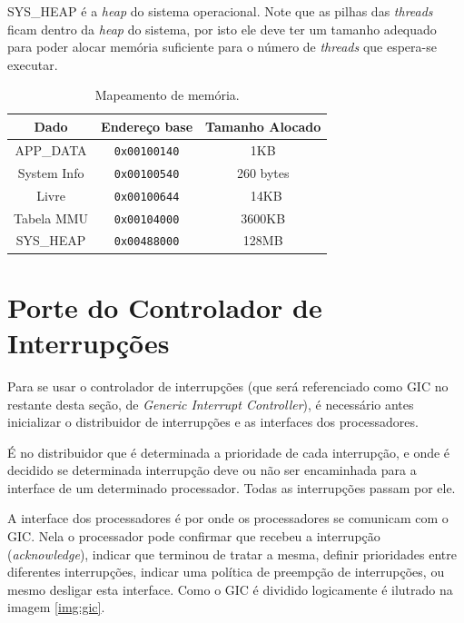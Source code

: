 SYS\_HEAP é a \emph{heap} do sistema operacional. Note que as pilhas das \emph{threads} ficam dentro da \emph{heap} do sistema, por isto ele deve ter um tamanho adequado para poder alocar memória suficiente para o número de \emph{threads} que espera-se executar.




\begin{table}[ht]
	\centering
	\begin{tabular}{ccc}
		\hline \hline
		Dado & Endereço base & Tamanho Alocado\\[0.5ex]
		\hline
		APP\_DATA		& \verb+0x00100140+ & 1KB\\
		System Info		& \verb+0x00100540+ & 260 bytes\\
		Livre			& \verb+0x00100644+ & ~14KB\\
		Tabela MMU		& \verb+0x00104000+ & 3600KB\\
		SYS\_HEAP		& \verb+0x00488000+ & 128MB\\[1ex]
		\hline
	\end{tabular}
	\caption{Mapeamento de memória.}
	\label{tab:mem}
\end{table}


\section{Porte do Controlador de Interrupções}

Para se usar o controlador de interrupções (que será referenciado como GIC no restante desta seção, de \emph{Generic Interrupt Controller}), é necessário antes inicializar o distribuidor de interrupções e as interfaces dos processadores.

É no distribuidor que é determinada a prioridade de cada interrupção, e onde é decidido se determinada interrupção deve ou não ser encaminhada para a interface de um determinado processador. Todas as interrupções passam por ele.

A interface dos processadores é por onde os processadores se comunicam com o GIC. Nela o processador pode confirmar que recebeu a interrupção (\emph{acknowledge}), indicar que terminou de tratar a mesma, definir prioridades entre diferentes interrupções, indicar uma política de preempção de interrupções, ou mesmo desligar esta interface. Como o GIC é dividido logicamente é ilutrado na imagem \ref{img:gic}.

